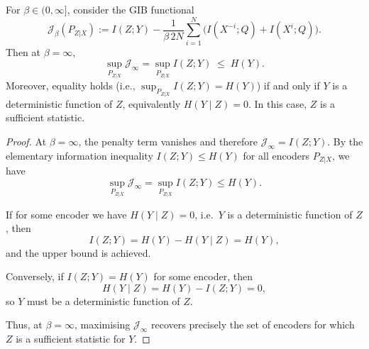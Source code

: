 \documentclass[10pt,a4paper]{amsart}
\begin{document}
\begin{theorem}
For $\beta\in(0,\infty]$, consider the GIB functional
\[
\mathcal{J}_\beta(P_{Z|X})
:= I(Z;Y)
- \frac{1}{\beta\,2N}\sum_{i=1}^N 
\Big( I(X^{-i};Q) + I(X^{i};Q) \Big).
\]
Then at $\beta=\infty$,
\[
\sup_{P_{Z|X}} \mathcal{J}_\infty
= \sup_{P_{Z|X}} I(Z;Y)
\;\le\; H(Y).
\]
Moreover, equality holds (i.e., $\sup_{P_{Z|X}} I(Z;Y)=H(Y)$) if and only if
$Y$ is a deterministic function of $Z$, equivalently $H(Y\mid Z)=0$.
In this case, $Z$ is a sufficient statistic.
\end{theorem}

\begin{proof}
At $\beta=\infty$, the penalty term vanishes and therefore
$\mathcal{J}_\infty = I(Z;Y)$.  
By the elementary information inequality
$I(Z;Y) \le H(Y)$ for all encoders $P_{Z|X}$, we have
\[
\sup_{P_{Z|X}} \mathcal{J}_\infty
= \sup_{P_{Z|X}} I(Z;Y)
\le H(Y).
\]

If for some encoder we have $H(Y\mid Z)=0$, i.e.\ $Y$ is a deterministic 
function of $Z$, then
\[
I(Z;Y) = H(Y) - H(Y\mid Z) = H(Y),
\]
and the upper bound is achieved.

Conversely, if $I(Z;Y)=H(Y)$ for some encoder, then
\[
H(Y\mid Z) = H(Y) - I(Z;Y) = 0,
\]
so $Y$ must be a deterministic function of $Z$.

Thus, at $\beta=\infty$, maximising $\mathcal{J}_\infty$ recovers precisely
the set of encoders for which $Z$ is a sufficient statistic for $Y$.
\end{proof}
\end{document}
